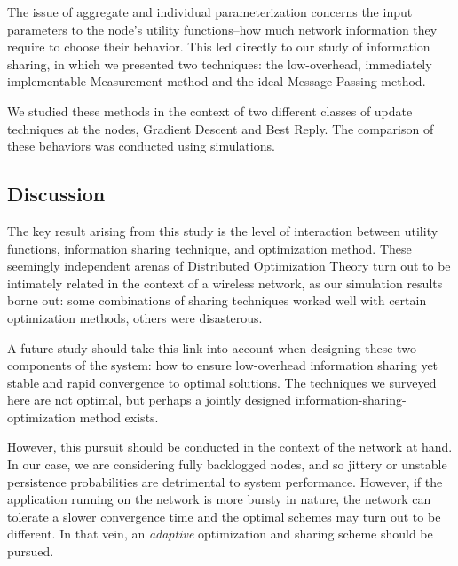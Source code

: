 \documentclass[11pt]{IEEEtran}
\theoremstyle{definition}
\begin{document}
The issue of aggregate and individual parameterization concerns the input parameters to the node's utility functions--how much network information they require to choose their behavior.  This led directly to our study of information sharing, in which we presented two techniques: the low-overhead, immediately implementable Measurement method and the ideal Message Passing method.

We studied these methods in the context of two different classes of update techniques at the nodes, Gradient Descent and Best Reply.  The comparison of these behaviors was conducted using simulations.

\subsection{Discussion}

The key result arising from this study is the level of interaction between utility functions, information sharing technique, and optimization method. These seemingly independent arenas of Distributed Optimization Theory turn out to be intimately related in the context of a wireless network, as our simulation results borne out: some combinations of sharing techniques worked well with certain optimization methods, others were disasterous.

A future study should take this link into account when designing these two components of the system: how to ensure low-overhead information sharing yet stable and rapid convergence to optimal solutions.  The techniques we surveyed here are not optimal, but perhaps a jointly designed information-sharing-optimization method exists.

However, this pursuit should be conducted in the context of the network at hand.  In our case, we are considering fully backlogged nodes, and so jittery or unstable persistence probabilities are detrimental to system performance. However, if the application running on the network is more bursty in nature, the network can tolerate a slower convergence time and the optimal schemes may turn out to be different.  In that vein, an \emph{adaptive} optimization and sharing scheme should be pursued.
\end{document}
